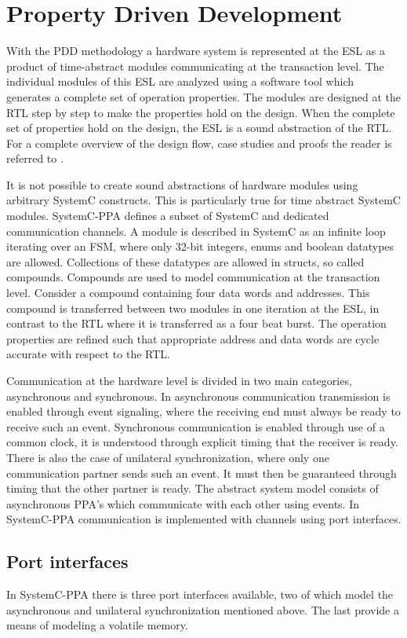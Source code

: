 \section{Property Driven Development}
\label{sec:pdd}
With the PDD methodology a hardware system is represented at the ESL as a product of time-abstract modules communicating at the transaction level. The individual modules of this ESL are analyzed using a software tool \cite{descam} which generates a complete set of operation properties. The modules are designed at the RTL step by step to make the properties hold on the design. When the complete set of properties hold on the design, the ESL is a sound abstraction of the RTL. For a complete overview of the design flow, case studies and proofs the reader is referred to \cite{pddref}. \par
It is not possible to create sound abstractions of hardware modules using arbitrary SystemC constructs. This is particularly true for time abstract SystemC modules. SystemC-PPA defines a subset of SystemC and dedicated communication channels. A module is described in SystemC as an infinite loop iterating over an FSM, where only 32-bit integers, enums and boolean datatypes are allowed. Collections of these datatypes are allowed in structs, so called compounds. Compounds are used to model communication at the transaction level. Consider a compound containing four data words and addresses. This compound is transferred between two modules in one iteration at the ESL, in contrast to the RTL where it is transferred as a four beat burst. The operation properties are refined such that appropriate address and data words are cycle accurate with respect to the RTL. \par
Communication at the hardware level is divided in two main categories, asynchronous and synchronous. In asynchronous communication transmission is enabled through event signaling, where the receiving end must always be ready to receive such an event. Synchronous communication is enabled through use of a common clock, it is understood through explicit timing that the receiver is ready. There is also the case of unilateral synchronization, where only one communication partner sends such an event. It must then be guaranteed through timing that the other partner is ready. The abstract system model consists of asynchronous PPA's which communicate with each other using events. In SystemC-PPA communication is implemented with channels using port interfaces.


\subsection{Port interfaces}
\label{sub:ports}       
In SystemC-PPA there is three port interfaces available, two of which model the asynchronous and unilateral synchronization mentioned above. The last provide a means of modeling a volatile memory. 

